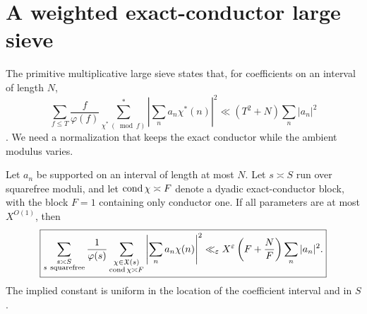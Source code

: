 \section{A weighted exact-conductor large sieve}
\label{sec:exact-conductor-sieve}

The primitive multiplicative large sieve states that, for coefficients
on an interval of length \(N\),
\begin{equation}
 \sum_{f\le T}\frac f{\varphi(f)}
 \sum_{\chi^*\ (\bmod f)}^*
 \left|\sum_na_n\chi^*(n)\right|^2
 \ll (T^2+N)\sum_n|a_n|^2
 \label{eq:primitive-large-sieve}
\end{equation}
\citep[Chapter~7]{IwaniecKowalski2004}.  We need a normalization that
keeps the exact conductor while the ambient modulus varies.

\begin{theorem}
\label{thm:exact-conductor-large-sieve}
Let \(a_n\) be supported on an interval of length at most \(N\).  Let
\(s\asymp S\) run over squarefree moduli, and let
\(\operatorname{cond}\chi\asymp F\) denote a dyadic exact-conductor block, with the
block \(F=1\) containing only conductor one.  If all parameters are at
most \(X^{O(1)}\), then
\begin{equation}
 \boxed{
 \sum_{\substack{s\asymp S\\s\ {\rm squarefree}}}
 \frac1{\varphi(s)}
 \sum_{\substack{\chi\in\mathfrak X(s)\\\operatorname{cond}\chi\asymp F}}
 \left|\sum_na_n\chi(n)\right|^2
 \ll_\varepsilon X^\varepsilon
 \left(F+\frac NF\right)\sum_n|a_n|^2.}
 \label{eq:exact-conductor-large-sieve}
\end{equation}
The implied constant is uniform in the location of the coefficient
interval and in \(S\).
\end{theorem}

